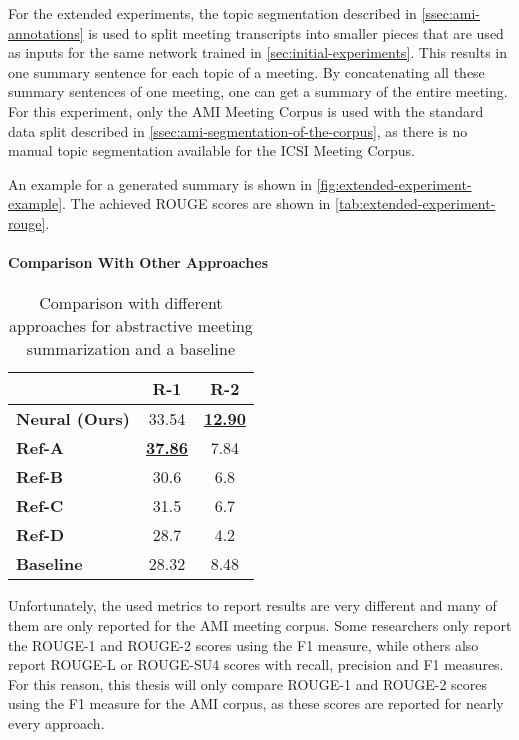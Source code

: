 For the extended experiments, the topic segmentation described in \cref{ssec:ami-annotations} is used to split meeting transcripts into smaller pieces that are used as inputs for the same network trained in \cref{sec:initial-experiments}.
This results in one summary sentence for each topic of a meeting.
By concatenating all these summary sentences of one meeting, one can get a summary of the entire meeting.
For this experiment, only the AMI Meeting Corpus is used with the standard data split described in \cref{ssec:ami-segmentation-of-the-corpus}, as there is no manual topic segmentation available for the ICSI Meeting Corpus. %

An example for a generated summary is shown in \cref{fig:extended-experiment-example}.
The achieved ROUGE scores are shown in \cref{tab:extended-experiment-rouge}.

\paragraph{Comparison With Other Approaches}

\begin{table}[]
\centering
\begin{tabular}{@{}lcc@{}}
\toprule
                       & \textbf{R-1}     & \textbf{R-2}     \\ \midrule
\textbf{Neural (Ours)} & 33.54                & \underline{\textbf{12.90}} \\
\textbf{Ref-A}         & \underline{\textbf{37.86}} & 7.84                 \\
\textbf{Ref-B}         & 30.6                 & 6.8                  \\
\textbf{Ref-C}         & 31.5                 & 6.7                  \\
\textbf{Ref-D}         & 28.7                 & 4.2                  \\
\textbf{Baseline}      & 28.32                & 8.48                 \\ \bottomrule
\end{tabular}
\caption{Comparison with different approaches for abstractive meeting summarization and a baseline}
\label{tab:comparison}
\end{table}

Unfortunately, the used metrics to report results are very different and many of them are only reported for the AMI meeting corpus.
Some researchers only report the ROUGE-1 and ROUGE-2 scores using the F1 measure, while others also report ROUGE-L or ROUGE-SU4 scores with recall, precision and F1 measures.
For this reason, this thesis will only compare ROUGE-1 and ROUGE-2 scores using the F1 measure for the AMI corpus, as these scores are reported for nearly every approach.

